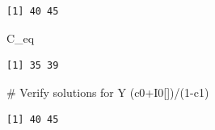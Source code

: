 \documentclass[
  letterpaper,
  DIV=11,
  numbers=noendperiod]{scrreprt}
\newenvironment{Shaded}{\begin{snugshade}}{\end{snugshade}}
\newcommand{\CommentTok}[1]{\textcolor[rgb]{0.37,0.37,0.37}{#1}}
\newcommand{\DecValTok}[1]{\textcolor[rgb]{0.68,0.00,0.00}{#1}}
\newcommand{\NormalTok}[1]{\textcolor[rgb]{0.00,0.23,0.31}{#1}}
\newcommand{\SpecialCharTok}[1]{\textcolor[rgb]{0.37,0.37,0.37}{#1}}
\begin{document}
\begin{verbatim}
[1] 40 45
\end{verbatim}

\begin{Shaded}
\begin{Highlighting}[]
\NormalTok{C\_eq}
\end{Highlighting}
\end{Shaded}

\begin{verbatim}
[1] 35 39
\end{verbatim}

\begin{Shaded}
\begin{Highlighting}[]
\CommentTok{\# Verify solutions for Y}
\NormalTok{(c0}\SpecialCharTok{+}\NormalTok{I0[])}\SpecialCharTok{/}\NormalTok{(}\DecValTok{1}\SpecialCharTok{{-}}\NormalTok{c1)}
\end{Highlighting}
\end{Shaded}

\begin{verbatim}
[1] 40 45
\end{verbatim}
\end{document}
